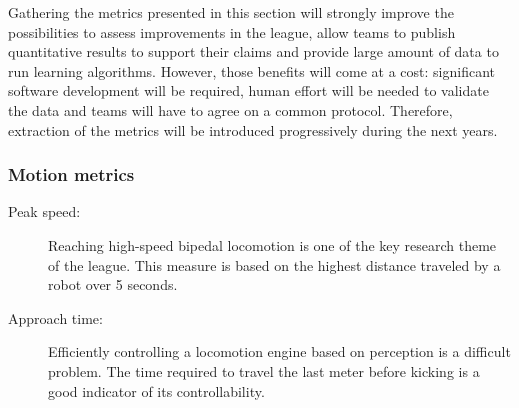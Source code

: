\documentclass{article}
\begin{document}
Gathering the metrics presented in this section will strongly improve the
possibilities to assess improvements in the league, allow teams to publish
quantitative results to support their claims and provide large amount of data
to run learning algorithms.
However, those benefits will come at a cost:
significant software development will be required,
human effort will be needed to validate the data and teams will have to agree on
a common protocol.
Therefore, extraction of the metrics will be introduced progressively during the
next years.


\subsubsection{Motion metrics}

\begin{description}
\item[Peak speed:] Reaching high-speed bipedal locomotion is one of the key
  research theme of the league.
  This measure is based on the highest distance traveled by a robot over 5 seconds.
  
\item[Approach time:] Efficiently controlling a locomotion engine based on perception
  is a difficult problem.
  The time required to travel the last meter before kicking is a good indicator
  of its controllability.


\end{description}
\end{document}
